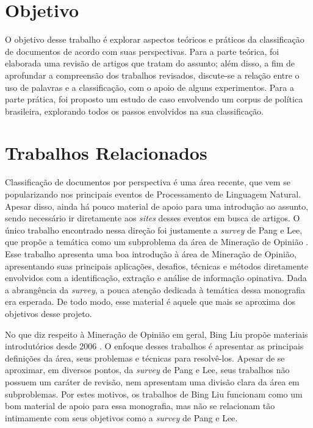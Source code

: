 
\section{Objetivo}
\label{objetivo}

O objetivo desse trabalho é explorar aspectos teóricos e práticos da classificação de documentos de acordo com suas perspectivas. Para a parte teórica, foi elaborada uma revisão de artigos que tratam do assunto; além disso, a fim de aprofundar a compreensão dos trabalhos revisados, discute-se a relação entre o uso de palavras e a classificação, com o apoio de alguns experimentos. Para a parte prática, foi proposto um estudo de caso envolvendo um corpus de política brasileira, explorando todos os passos envolvidos na sua classificação.

\section{Trabalhos Relacionados}
\label{relacionados}

Classificação de documentos por perspectiva é uma área recente, que vem se popularizando nos principais eventos de Processamento de Linguagem Natural. Apesar disso, ainda há pouco material de apoio para uma introdução ao assunto, sendo necessário ir diretamente aos \emph{sites} desses eventos em busca de artigos. O único trabalho encontrado nessa direção foi justamente a \emph{survey} de Pang e Lee, que propõe a temática como um subproblema da área de Mineração de Opinião \cite{omsa}. Esse trabalho apresenta uma boa introdução à área de Mineração de Opinião, apresentando suas principais aplicações, desafios, técnicas e métodos diretamente envolvidos com a identificação, extração e análise de informação opinativa. Dada a abrangência da \emph{survey}, a pouca atenção dedicada à temática dessa monografia era esperada. De todo modo, esse material é aquele que mais se aproxima dos objetivos desse projeto.

No que diz respeito à Mineração de Opinião em geral, Bing Liu propõe materiais introdutórios desde 2006 \cite{bingliu} \cite{handbook-liu}. O enfoque desses trabalhos é apresentar as principais definições da área, seus problemas e técnicas para resolvê-los. Apesar de se aproximar, em diversos pontos, da \emph{survey} de Pang e Lee, seus trabalhos não possuem um caráter de revisão, nem apresentam uma divisão clara da área em subproblemas. Por estes motivos, os trabalhos de Bing Liu funcionam como um bom material de apoio para essa monografia, mas não se relacionam tão intimamente com seus objetivos como a \emph{survey} de Pang e Lee.

